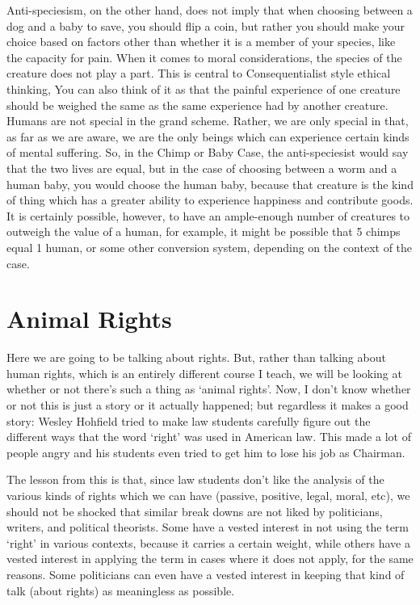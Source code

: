 Anti-speciesism, on the other hand, does not imply that when choosing between a dog and a baby to save, you should flip a coin, but rather you should make your choice based on factors other than whether it is a member of your species, like the capacity for pain. When it comes to moral considerations, the species of the creature does not play a part. This is central to Consequentialist style ethical thinking, You can also think of it as that the painful experience of one creature should be weighed the same as the same experience had by another creature. Humans are not special in the grand scheme. Rather, we are only special in that, as far as we are aware, we are the only beings which can experience certain kinds of mental suffering. So, in the Chimp or Baby Case, the anti-speciesist would say that the two lives are equal, but in the case of choosing between a worm and a human baby, you would choose the human baby, because that creature is the kind of thing which has a greater ability to experience happiness and contribute goods.  It is certainly possible, however, to have an ample-enough number of creatures to outweigh the value of a human, for example, it might be possible that 5 chimps equal 1 human, or some other conversion system, depending on the context of the case. 

\section{Animal Rights}
Here we are going to be talking about rights. But, rather than talking about human rights, which is an entirely different course I teach, we will be looking at whether or not there's such a thing as `animal rights'. Now, I don't know whether or not this is just a story or it actually happened; but regardless it makes a good story: Wesley Hohfield tried to make law students carefully figure out the different ways that the word ‘right’ was used in American law. This made a lot of people angry and his students even tried to get him to lose his job as Chairman. 

The lesson from this is that, since law students don’t like the analysis of the various kinds of rights which we can have (passive, positive, legal, moral, etc), we should not be shocked that similar break downs are not liked by politicians, writers, and political theorists. Some have a vested interest in not using the term `right' in various contexts, because it carries a certain weight, while others have a vested interest in applying the term in cases where it does not apply, for the same reasons. Some politicians can even have a vested interest in keeping that kind of talk (about rights) as meaningless as possible.

